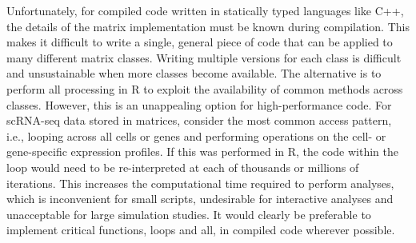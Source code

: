 \documentclass[10pt,letterpaper]{article}
\begin{document}
Unfortunately, for compiled code written in statically typed languages like C++, the details of the matrix implementation must be known during compilation.
This makes it difficult to write a single, general piece of code that can be applied to many different matrix classes.
Writing multiple versions for each class is difficult and unsustainable when more classes become available.
The alternative is to perform all processing in R to exploit the availability of common methods across classes.
However, this is an unappealing option for high-performance code.
For scRNA-seq data stored in matrices, consider the most common access pattern, i.e., looping across all cells or genes and performing operations on the cell- or gene-specific expression profiles.
If this was performed in R, the code within the loop would need to be re-interpreted at each of thousands or millions of iterations.
This increases the computational time required to perform analyses, which is inconvenient for small scripts, undesirable for interactive analyses and unacceptable for large simulation studies.
It would clearly be preferable to implement critical functions, loops and all, in compiled code wherever possible.


{\small
    
    
}
\end{document}
